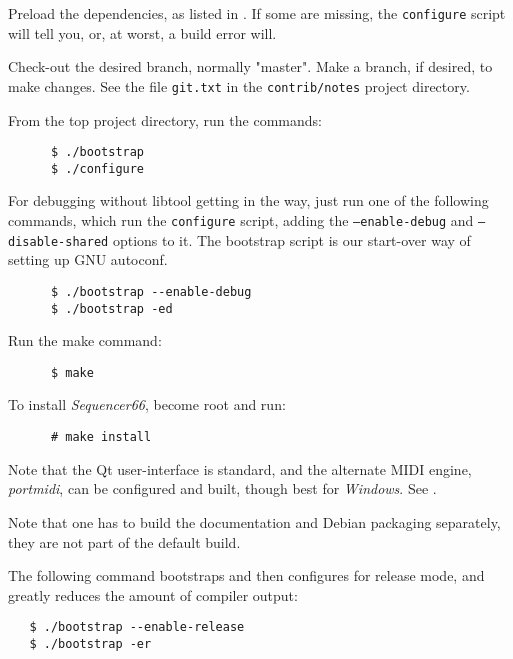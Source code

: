    \begin{enumber}
      \item Preload the dependencies, as listed in
         .
          If some are missing, the
          \texttt{configure} script will tell you,
          or, at worst, a build error will.
      \item Check-out the desired branch, normally "master".
         Make a branch, if desired, to make changes.
         See the file \texttt{git.txt} in the
         \texttt{contrib/notes} project directory.
      \item From the top project directory, run the commands:
\begin{verbatim}
      $ ./bootstrap
      $ ./configure
\end{verbatim}
      \item For debugging without libtool getting in the way, just run
         one of the following commands, which run the
         \texttt{configure} script, adding the
         \texttt{--enable-debug} and
         \texttt{--disable-shared} options to it.
         The bootstrap script is our start-over
         way of setting up GNU autoconf.
\begin{verbatim}
      $ ./bootstrap --enable-debug
      $ ./bootstrap -ed
\end{verbatim}
      \item Run the make command:
\begin{verbatim}
      $ make
\end{verbatim}
      \item To install \textsl{Sequencer66}, become root and run:
\begin{verbatim}
      # make install
\end{verbatim}
   \end{enumber}

   Note that the Qt user-interface is standard, and the alternate MIDI
   engine, \textsl{portmidi}, can be configured and built, though best for
   \textsl{Windows}.
   See .

   Note that one has to build the documentation and Debian packaging
   separately, they are not part of the default build.

   The following command bootstraps and then configures
   for release mode, and greatly reduces the amount of compiler output:
 
\begin{verbatim}
   $ ./bootstrap --enable-release
   $ ./bootstrap -er
\end{verbatim}

